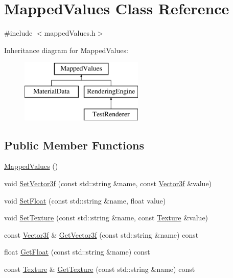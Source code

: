 \hypertarget{class_mapped_values}{}\section{Mapped\+Values Class Reference}
\label{class_mapped_values}


{\ttfamily \#include $<$mapped\+Values.\+h$>$}

Inheritance diagram for Mapped\+Values\+:\begin{figure}[H]
\begin{center}
\leavevmode
\includegraphics[height=3.000000cm]{class_mapped_values}
\end{center}
\end{figure}
\subsection*{Public Member Functions}
\begin{DoxyCompactItemize}
\item 
\hyperlink{class_mapped_values_a2f2b64544872889cf6403206f970bb7a}{Mapped\+Values} ()
\item 
void \hyperlink{class_mapped_values_aea6513980de91dc70e84a858cd470b51}{Set\+Vector3f} (const std\+::string \&name, const \hyperlink{class_vector3f}{Vector3f} \&value)
\item 
void \hyperlink{class_mapped_values_a44ae7ea73b6c2516fdd7fb0dce574300}{Set\+Float} (const std\+::string \&name, float value)
\item 
void \hyperlink{class_mapped_values_aa77284d7ea440391c052bde41996a2a3}{Set\+Texture} (const std\+::string \&name, const \hyperlink{class_texture}{Texture} \&value)
\item 
const \hyperlink{class_vector3f}{Vector3f} \& \hyperlink{class_mapped_values_a7e2399d8cb5ebd982aeffb59fe2c0854}{Get\+Vector3f} (const std\+::string \&name) const 
\item 
float \hyperlink{class_mapped_values_a8108f8905d63f905ba9a151c089c07b8}{Get\+Float} (const std\+::string \&name) const 
\item 
const \hyperlink{class_texture}{Texture} \& \hyperlink{class_mapped_values_ae63404d2d84b56f55bf6627d2f26bdc9}{Get\+Texture} (const std\+::string \&name) const 
\end{DoxyCompactItemize}


